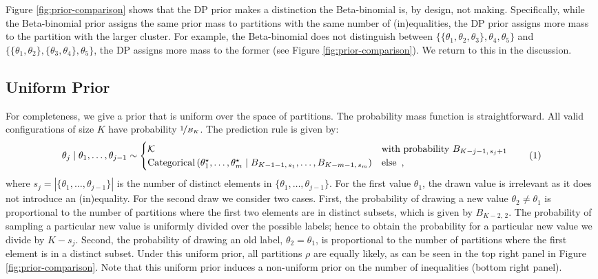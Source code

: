 \documentclass[11pt,a4paper]{article}
\theoremstyle{definition} %
\theoremstyle{case}
\newcommand{\bellnum}[1]{B_{#1}}
\newcommand{\rbellnum}[2]{B_{#1,\,#2}}
\newcommand{\setsize}[1]{|{#1}|}
\newcommand{\numberthis}{\addtocounter{equation}{1}\tag{\theequation}}
\newcommand{\FD}[1]{\textcolor{red}{Fabian: #1 }}
\begin{document}
Figure \ref{fig:prior-comparison} shows that the DP prior makes a distinction the Beta-binomial is, by design, not making. Specifically, while the Beta-binomial prior assigns the same prior mass to partitions with the same number of (in)equalities, the DP prior assigns more mass to the partition with the larger cluster. For example, the Beta-binomial does not distinguish between $\{\{\theta_1, \theta_2, \theta_3\}, \theta_4, \theta_5\}$ and $\{\{\theta_1, \theta_2\}, \{\theta_3, \theta_4\}, \theta_5\}$, the DP assigns more mass to the former (see Figure \ref{fig:prior-comparison}). We return to this in the discussion.

\subsection{Uniform Prior}
For completeness, we give a prior that is uniform over the space of partitions. The probability mass function is straightforward. All valid configurations of size $K$ have probability $\nicefrac{1}{\bellnum{K}}$. The prediction rule is given by:
\begin{equation}
    \theta_j \mid \theta_1, \ldots, \theta_{j - 1} \sim \begin{cases}
    \mathcal{K} & \text{with probability } \rbellnum{K - j - 1}{s_j + 1} \\
    \text{Categorical}\left(\theta_1^{\star}, \ldots, \theta_m^{\star} \mid \rbellnum{K - 1 - 1}{s_1}, \ldots, \rbellnum{K - m - 1}{s_m}\right) & \text{else} \enspace ,
    \end{cases} \numberthis
\end{equation}
where $s_j = \setsize{\{\theta_1, \ldots, \theta_{j - 1}\}}$ is the number of distinct elements in $\{\theta_1, \ldots, \theta_{j - 1}\}$. For the first value $\theta_1$, the drawn value is irrelevant as it does not introduce an (in)equality. For the second draw we consider two cases. First, the probability of drawing a new value $\theta_2 \neq \theta_1$ is proportional to the number of partitions where the first two elements are in distinct subsets, which is given by $\rbellnum{K - 2}{2}$. The probability of sampling a particular new value is uniformly divided over the possible labels; hence to obtain the probability for a particular new value we divide by $K - s_j$. Second, the probability of drawing an old label, $\theta_2 = \theta_1$, is proportional to the number of partitions where the first element is in a distinct subset. Under this uniform prior, all partitions $\rho$ are equally likely, as can be seen in the top right panel in Figure \ref{fig:prior-comparison}. Note that this uniform prior induces a non-uniform prior on the number of inequalities (bottom right panel).
\end{document}
